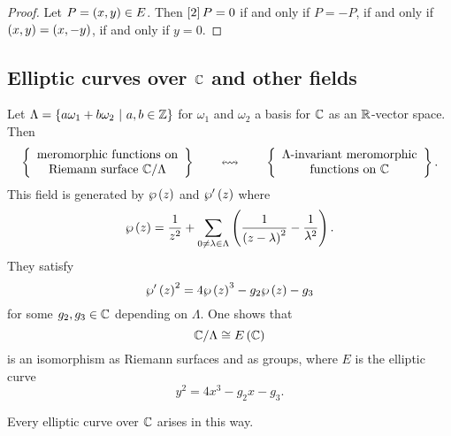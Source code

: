 \begin{proof}
Let $ P = \br{x, y} \in E $. Then $ \sbr{2}P = 0 $ if and only if $ P = -P $, if and only if $ \br{x, y} = \br{x, -y} $, if and only if $ y = 0 $.
\end{proof}

\subsection{Elliptic curves over \texorpdfstring{$ \mathbb{C} $}{C} and other fields}

Let $ \Lambda = \cbr{a\omega_1 + b\omega_2 \st a, b \in \ZZ} $ for $ \omega_1 $ and $ \omega_2 $ a basis for $ \mathbb{C} $ as an $ \mathbb{R} $-vector space. Then
$$ \correspondence{\text{meromorphic functions on} \\ \text{Riemann surface} \ \CC / \Lambda}{\text{$ \Lambda $-invariant meromorphic} \\ \text{functions on} \ \CC}. $$
This field is generated by $ \wp\br{z} $ and $ \wp'\br{z} $ where
$$ \wp\br{z} = \dfrac{1}{z^2} + \sum_{0 \ne \lambda \in \Lambda} \br{\dfrac{1}{\br{z - \lambda}^2} - \dfrac{1}{\lambda^2}}. $$
They satisfy
$$ \wp'\br{z}^2 = 4\wp\br{z}^3 - g_2\wp\br{z} - g_3 $$
for some $ g_2, g_3 \in \mathbb{C} $ depending on $ \Lambda $. One shows that
$$ \CC / \Lambda \cong E\br{\CC} $$
is an isomorphism as Riemann surfaces and as groups, where $ E $ is the elliptic curve
$$ y^2 = 4x^3 - g_2x - g_3. $$

\pagebreak

\begin{theorem}
Every elliptic curve over $ \mathbb{C} $ arises in this way.
\end{theorem}

